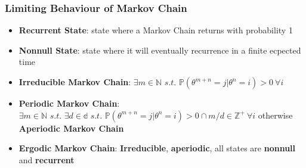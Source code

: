 \documentclass[12pt]{article}
\theoremstyle{definition}
\newcommand{\suchthat}{\textit{ s.t. }}
\newcommand{\Prob}[1]{\mathbb{P}(#1)}
\begin{document}
        \subsubsection*{Limiting Behaviour of Markov Chain}
        \begin{itemize}
            \item \textbf{Recurrent State}: state where a Markov Chain returns with probability 1
            \item \textbf{Nonnull State}: state where it will eventually recurrence in a finite ecpected time
            \item \textbf{Irreducible Markov Chain}: $\exists m \in \mathbb{N} \suchthat \Prob{\theta^{m +n} = j| \theta^n = i} > 0 \ \forall i$
            \item \textbf{Periodic Markov Chain}: $\exists m \in \mathbb{N} \suchthat \exists d \in \mathbb{d} \suchthat \Prob{\theta^{m +n} = j| \theta^n = i} > 0 \cap m/d \in \mathbb{Z^+}  \ \forall i$
                \subitem otherwise \textbf{Aperiodic Markov Chain}
            \item \textbf{Ergodic Markov Chain}: \textbf{Irreducible}, \textbf{aperiodic}, all states are \textbf{nonnull} and \textbf{recurrent}
        \end{itemize}
\end{document}
